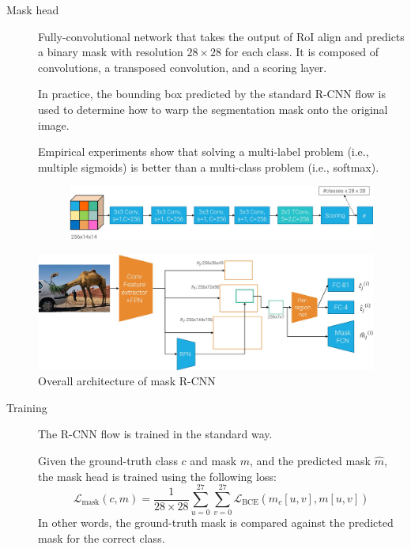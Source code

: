 \begin{description}
\begin{description}
            \item[Mask head] 
                Fully-convolutional network that takes the output of RoI align and predicts a binary mask with resolution $28 \times 28$ for each class. It is composed of convolutions, a transposed convolution, and a scoring layer.

                In practice, the bounding box predicted by the standard R-CNN flow is used to determine how to warp the segmentation mask onto the original image.

                \begin{remark}
                    Empirical experiments show that solving a multi-label problem (i.e., multiple sigmoids) is better than a multi-class problem (i.e., softmax).
                \end{remark}

                \begin{figure}[H]
                    \centering
                    \includegraphics[width=0.85\linewidth]{./img/_mask_rcnn_head.jpg}
                \end{figure}
        \end{description}

        \begin{figure}[H]
            \centering
            \includegraphics[width=0.85\linewidth]{./img/_mask_rcnn.jpg}
            \caption{Overall architecture of mask R-CNN}
        \end{figure}

        \begin{description}
        \item[Training]
            The R-CNN flow is trained in the standard way. 

            Given the ground-truth class $c$ and mask $m$, and the predicted mask $\hat{m}$, the mask head is trained using the following loss:
            \[ \mathcal{L}_\text{mask}(c, m) = \frac{1}{28 \times 28} \sum_{u=0}^{27} \sum_{v=0}^{27} \mathcal{L}_\text{BCE}\left( \hat{m}_{c}[u, v], m[u, v] \right) \]
            In other words, the ground-truth mask is compared against the predicted mask for the correct class.


\end{description}
\end{description}
